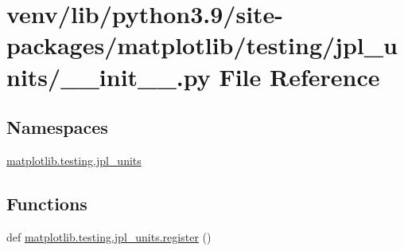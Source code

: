 \hypertarget{venv_2lib_2python3_89_2site-packages_2matplotlib_2testing_2jpl__units_2____init_____8py}{}\section{venv/lib/python3.9/site-\/packages/matplotlib/testing/jpl\+\_\+units/\+\_\+\+\_\+init\+\_\+\+\_\+.py File Reference}
\label{venv_2lib_2python3_89_2site-packages_2matplotlib_2testing_2jpl__units_2____init_____8py}
\subsection*{Namespaces}
\begin{DoxyCompactItemize}
\item 
 \hyperlink{namespacematplotlib_1_1testing_1_1jpl__units}{matplotlib.\+testing.\+jpl\+\_\+units}
\end{DoxyCompactItemize}
\subsection*{Functions}
\begin{DoxyCompactItemize}
\item 
def \hyperlink{namespacematplotlib_1_1testing_1_1jpl__units_ae5e86bf22e14304e26b47e66daf1188b}{matplotlib.\+testing.\+jpl\+\_\+units.\+register} ()
\end{DoxyCompactItemize}
